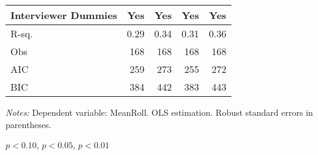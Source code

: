 \begin{table}[htbp]
\begin{threeparttable}
\begin{tabular}{l*{4}{D{.}{.}{-1}}}
Interviewer Dummies &                 Yes   &                 Yes   &                 Yes   &                 Yes   \\
\midrule
R-sq.               &                0.29   &                0.34   &                0.31   &                0.36   \\
Obs                 &                 168   &                 168   &                 168   &                 168   \\
AIC                 &                 259   &                 273   &                 255   &                 272   \\
BIC                 &                 384   &                 442   &                 383   &                 443   \\
\bottomrule
\end{tabular}
\begin{tablenotes}
\footnotesize
\item \textit{Notes:} Dependent variable: MeanRoll. OLS estimation. Robust standard errors in parentheses.
\item \sym{*} \(p<0.10\), \sym{**} \(p<0.05\), \sym{***} \(p<0.01\)
\end{tablenotes}
\end{threeparttable}
\label{tab:cheat_tot}
\end{table}
